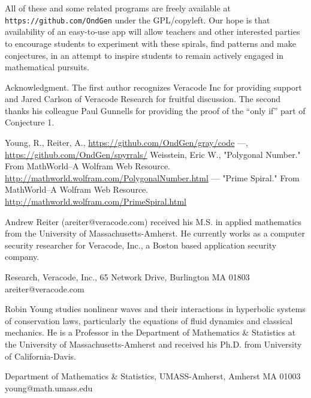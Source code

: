 \documentclass{article}
\theoremstyle{definition}
\begin{document}
All of these and some related programs are freely available at {\tt
  https://github.com/OndGen} under the GPL/copyleft.  Our hope is that
availability of an easy-to-use app will allow teachers and other
interested parties to encourage students to experiment with these
spirals, find patterns and make conjectures, in an attempt to inspire
students to remain actively engaged in mathematical pursuits.



\begin{acknowledgment}{Acknowledgment.}
  The first author recognizes Veracode Inc for providing support and
  Jared Carlson of Veracode Research for fruitful discussion.  The
  second thanks his colleague Paul Gunnells for providing the proof of
  the ``only if'' part of Conjecture 1.
\end{acknowledgment}

\begin{thebibliography}{1}
 Young, R., Reiter, A., \url{https://github.com/OndGen/gray/code}
 ---, \url{https://github.com/OndGen/spyrrals/}
 Weisstein, Eric W., "Polygonal Number." From MathWorld--A Wolfram Web Resource. \url{http://mathworld.wolfram.com/PolygonalNumber.html} 
 --- "Prime Spiral." From MathWorld--A Wolfram Web Resource. \url{http://mathworld.wolfram.com/PrimeSpiral.html}
\end{thebibliography}

\begin{biog}
\item[Andrew Reiter] (areiter@veracode.com) received his M.S. in
  applied mathematics from the University of Massachusetts-Amherst. He
  currently works as a computer security researcher for Veracode,
  Inc., a Boston based application security company.
\begin{affil}
Research,  Veracode, Inc., 65 Network Drive, Burlington MA 01803\\
areiter@veracode.com
\end{affil}

\item[Robin Young] studies nonlinear waves and their interactions in
  hyperbolic systems of conservation laws, particularly the equations
  of fluid dynamics and classical mechanics.  He is a Professor in the
  Department of Mathematics \& Statistics at the University of
  Massachusetts-Amherst and received his Ph.D. from University of
  California-Davis.
\begin{affil}
Department of Mathematics \& Statistics, UMASS-Amherst, Amherst MA 01003 \\
young@math.umass.edu
\end{affil}
\end{biog}
\vfill\eject
\end{document}
